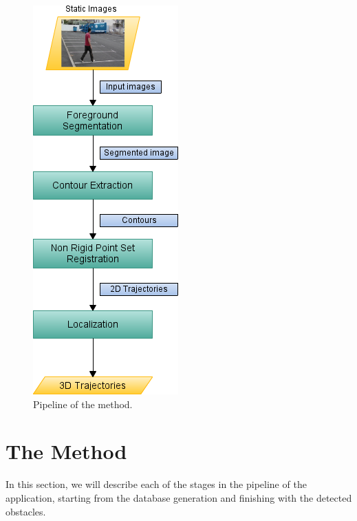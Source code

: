 \begin{figure}[thb]
  \centering
  \includegraphics{pipeline}
  \caption{Pipeline of the method.}
  \label{fig:cp02_pipeline}
\end{figure}

\section{The Method}\label{ch:chapter02_01}

In this section, we will describe each of the stages in the pipeline of the application, starting from the database generation and finishing with the detected obstacles. 

